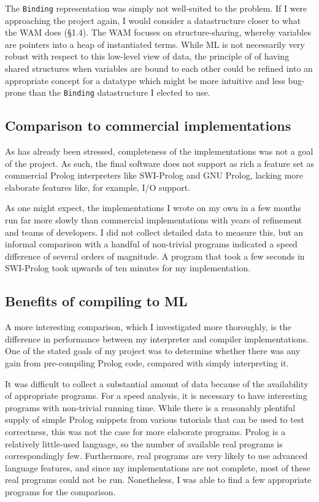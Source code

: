 \documentclass[12pt]{article}
\begin{document}
The \verb|Binding| representation was simply not well-suited to the problem. 
If I were approaching the project again, I would consider a datastructure closer to what the WAM does (\S1.4). 
The WAM focuses on structure-sharing, whereby variables are pointers into a heap of instantiated terms. 
While ML is not necessarily very robust with respect to this low-level view of data, the principle of of having shared structures when variables are bound to each other could be refined into an appropriate concept for a datatype which might be more intuitive and less bug-prone than the \verb|Binding| datastructure I elected to use.

\subsection{Comparison to commercial implementations}

As has already been stressed, completeness of the implementations was not a goal of the project. 
As such, the final software does not support as rich a feature set as commercial Prolog interpreters like SWI-Prolog and GNU Prolog, lacking more elaborate features like, for example, I/O support.

As one might expect, the implementations I wrote on my own in a few months run far more slowly than commercial implementations with years of refinement and teams of developers. 
I did not collect detailed data to measure this, but an informal comparison with a handful of non-trivial programs indicated a speed difference of several orders of magnitude. 
A program that took a few seconds in SWI-Prolog took upwards of ten minutes for my implementation.

\subsection{Benefits of compiling to ML}

A more interesting comparison, which I investigated more thoroughly, is the difference in performance between my interpreter and compiler implementations. One of the stated goals of my project was to determine whether there was any gain from pre-compiling Prolog code, compared with simply interpreting it.

It was difficult to collect a substantial amount of data because of the availability of appropriate programs. For a speed analysis, it is necessary to have interesting programs with non-trivial running time. While there is a reasonably plentiful supply of simple Prolog snippets from various tutorials that can be used to test correctness, this was not the case for more elaborate programs. Prolog is a relatively little-used language, so the number of available real programs is correspondingly few. Furthermore, real programs are very likely to use advanced language features, and since my implementations are not complete, most of these real programs could not be run. Nonetheless, I was able to find a few appropriate programs for the comparison.
\end{document}
